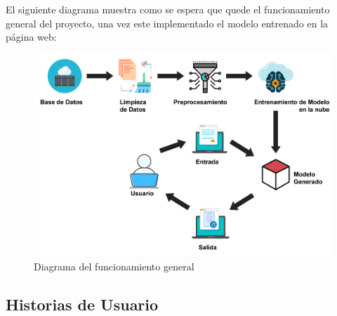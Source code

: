 \documentclass[12pt, a4paper, titlepage]{report}
\begin{document}
		El siguiente diagrama muestra como se espera que quede el funcionamiento general del proyecto, una vez este implementado el modelo entrenado en la página web:
		
		\begin{figure}[H] \caption{Diagrama del funcionamiento general}
			\includegraphics[scale=.25]{./imagenes/Disenio/Arquitectura/Arquitectura_sistema.png}
			\centering 
		\end{figure}
	
		\subsection{Historias de Usuario}
		
\end{document}
